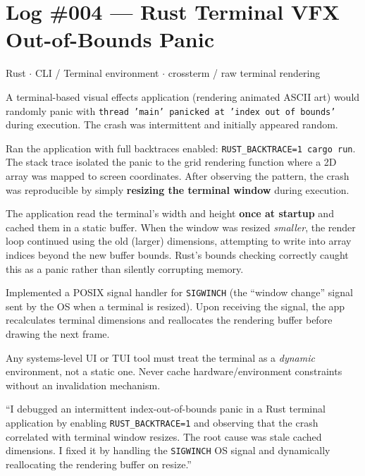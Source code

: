 \documentclass[11pt, letterpaper]{article}
\begin{document}
\section*{Log \#004 --- Rust Terminal VFX Out-of-Bounds Panic}

\begin{tcolorbox}[colback=logbg, colframe=logborder, arc=3pt, boxrule=1pt]
\begin{description}[noitemsep, leftmargin=2cm, style=nextline]
  \item[\textbf{Stack}] Rust $\cdot$ CLI / Terminal environment $\cdot$ crossterm / raw terminal rendering
  \item[\textbf{Symptom}] A terminal-based visual effects application (rendering animated ASCII art) would randomly panic with \texttt{thread 'main' panicked at 'index out of bounds'} during execution. The crash was intermittent and initially appeared random.
  \item[\textbf{Diagnosis}] Ran the application with full backtraces enabled: \texttt{RUST\_BACKTRACE=1 cargo run}. The stack trace isolated the panic to the grid rendering function where a 2D array was mapped to screen coordinates. After observing the pattern, the crash was reproducible by simply \textbf{resizing the terminal window} during execution.
  \item[\textbf{Root Cause}] The application read the terminal's width and height \textbf{once at startup} and cached them in a static buffer. When the window was resized \emph{smaller}, the render loop continued using the old (larger) dimensions, attempting to write into array indices beyond the new buffer bounds. Rust's bounds checking correctly caught this as a panic rather than silently corrupting memory.
  \item[\textbf{Fix}] Implemented a POSIX signal handler for \texttt{SIGWINCH} (the ``window change'' signal sent by the OS when a terminal is resized). Upon receiving the signal, the app recalculates terminal dimensions and reallocates the rendering buffer before drawing the next frame.
  \item[\textbf{Prevention}] Any systems-level UI or TUI tool must treat the terminal as a \emph{dynamic} environment, not a static one. Never cache hardware/environment constraints without an invalidation mechanism.
  \item[\textbf{STAR summary}] ``I debugged an intermittent index-out-of-bounds panic in a Rust terminal application by enabling \texttt{RUST\_BACKTRACE=1} and observing that the crash correlated with terminal window resizes. The root cause was stale cached dimensions. I fixed it by handling the \texttt{SIGWINCH} OS signal and dynamically reallocating the rendering buffer on resize.''
\end{description}
\end{tcolorbox}
\end{document}
